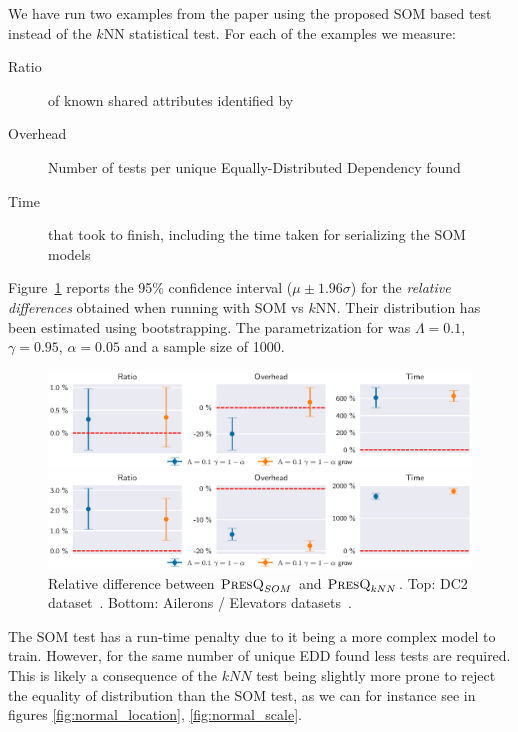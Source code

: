 We have run two examples from the \PresQ paper using the proposed \gls{SOM}  based test
instead of the $k$NN statistical test. For each of the examples we measure:

\begin{description}
    \item[Ratio] of known shared attributes identified by \PresQ
    \item[Overhead] Number of tests per unique Equally-Distributed Dependency found
    \item[Time] that took \PresQ to finish, including the time taken for serializing the \gls{SOM}  models
\end{description}

Figure~\ref{fig:presq_som} reports the 95\% confidence interval ($\mu \pm 1.96 \sigma$)
for the \emph{relative differences} obtained when running with \gls{SOM}  vs
$k$NN. Their distribution has been estimated using bootstrapping. The parametrization for
\PresQ was $\Lambda = 0.1$, $\gamma=0.95$, $\alpha=0.05$ and a sample size of 1000.

\begin{figure}[ht]
    \centering
    \includegraphics[width=\textwidth]{images/6_som/presq_som.eps}
    
    \includegraphics[width=\textwidth]{images/6_som/presq_som_aileron.eps}
    \caption[Relative difference between $\PresQ_{SOM}$ and $\PresQ_{kNN}$.]{
        Relative difference between $\PresQ_{SOM}$ and $\PresQ_{kNN}$.
        Top: DC2 dataset~\cite{EuclidDesprez2020}.
        Bottom: Ailerons / Elevators datasets~\cite{alcala2011keel}.
    }
    \label{fig:presq_som}
\end{figure}

The \gls{SOM}  test has a run-time penalty due to it being a more complex model to train.
However, for the same number of unique EDD found less tests are required. This is likely a consequence of
the $kNN$ test being slightly more prone to reject the equality of distribution than the \gls{SOM} 
test, as we can for instance see in figures \ref{fig:normal_location}, \ref{fig:normal_scale}.

